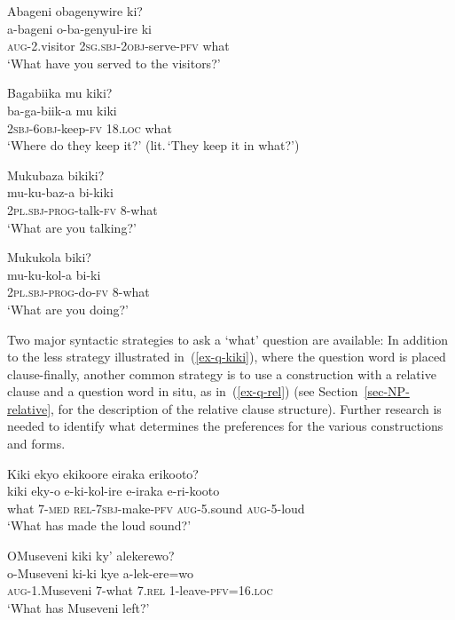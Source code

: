 \ea \label{ex-q-kiki}
\begin{xlist}
\ex	\label{ex-q-ki-object}
	\glll Abageni obagenywire ki?\\
		 a-bageni o-ba-genyul-ire ki\\
		\textsc{aug}-2.visitor 2\textsc{sg.sbj}-\textsc{2obj}-serve-\textsc{pfv} what\\
	\glt `What have you served to the visitors?'

\ex	\label{ex-q-kiki-obl}
	\glll Bagabiika mu kiki?\\
		 ba-ga-biik-a mu kiki\\
		\textsc{2sbj}-\textsc{6obj}-keep-\textsc{fv} 18.\textsc{loc} what\\
	\glt `Where do they keep it?' (lit.\,`They keep it in what?')
		
\ex	\label{ex-q-biki}
	\glll Mukubaza bikiki?\\
		 mu-ku-baz-a bi-kiki\\
		\textsc{2pl.sbj}-\textsc{prog}-talk-\textsc{fv}  8-what\\
	\glt `What are you talking?'

\ex	\label{ex-q-bikiki}
	\glll Mukukola biki?\\
		 mu-ku-kol-a bi-ki\\
		\textsc{2pl.sbj}-\textsc{prog}-do-\textsc{fv}  8-what\\
	\glt `What are you doing?'
\end{xlist}
\z

Two major syntactic strategies to ask a `what' question are available: 
In addition to the less strategy illustrated in~(\ref{ex-q-kiki}), where the question word is placed clause-finally, another common strategy is to use a construction with a relative clause and a question word in situ, as in~(\ref{ex-q-rel}) (see Section~\ref{sec-NP-relative}, for the description of the relative clause structure). 
Further research is needed to identify what determines the preferences for the various constructions and forms.

\ea \label{ex-q-rel}
\begin{xlist}

\ex	\label{ex-q-rel1}
	\glll Kiki ekyo ekikoore eiraka erikooto?\\
		 kiki eky-o e-ki-kol-ire e-iraka e-ri-kooto\\
		what 7-\textsc{med} \textsc{rel}-\textsc{7sbj}-make-\textsc{pfv} \textsc{aug}-5.sound \textsc{aug}-5-loud\\
	\glt `What has made the loud sound?’

\ex	\label{ex-q-rel2}
	\glll OMuseveni kiki ky' alekerewo?\\
		 o-Museveni ki-ki kye a-lek-ere=wo\\
		\textsc{aug}-1.Museveni 7-what \textsc{7.rel} 1-leave-\textsc{pfv}=\textsc{16.loc}\\
	\glt `What has Museveni left?’
\end{xlist}
\z

